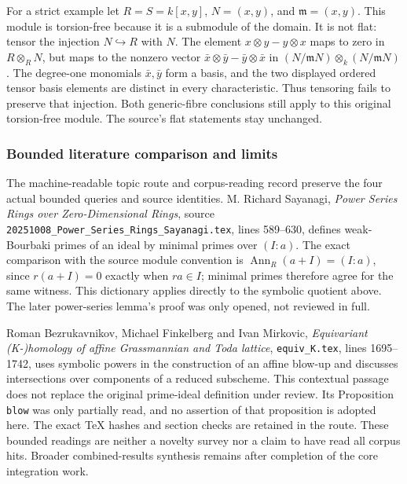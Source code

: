 For a strict example let \(R=S=k[x,y]\), \(N=(x,y)\), and \(\mathfrak m=(x,y)\). This module is torsion-free because it is a submodule of the domain. It is not flat: tensor the injection \(N\hookrightarrow R\) with \(N\). The element \(x\otimes y-y\otimes x\) maps to zero in \(R\otimes_RN\), but maps to the nonzero vector \(\bar x\otimes\bar y-\bar y\otimes\bar x\) in \((N/\mathfrak mN)\otimes_k(N/\mathfrak mN)\). The degree-one monomials \(\bar x,\bar y\) form a basis, and the two displayed ordered tensor basis elements are distinct in every characteristic. Thus tensoring fails to preserve that injection. Both generic-fibre conclusions still apply to this original torsion-free module. The source's flat statements stay unchanged.

\subsubsection{Bounded literature comparison and limits}\label{bounded-literature-comparison-and-limits}

The machine-readable topic route and corpus-reading record preserve the four actual bounded queries and source identities. M. Richard Sayanagi, \emph{Power Series Rings over Zero-Dimensional Rings}, source \texttt{20251008\_Power\_Series\_Rings\_Sayanagi.tex}, lines 589--630, defines weak-Bourbaki primes of an ideal by minimal primes over \((I:a)\). The exact comparison with the source module convention is \(\operatorname{Ann}_R(a+I)=(I:a)\), since \(r(a+I)=0\) exactly when \(ra\in I\); minimal primes therefore agree for the same witness. This dictionary applies directly to the symbolic quotient above. The later power-series lemma's proof was only opened, not reviewed in full.

Roman Bezrukavnikov, Michael Finkelberg and Ivan Mirkovic, \emph{Equivariant (K-)homology of affine Grassmannian and Toda lattice}, \texttt{equiv\_K.tex}, lines 1695--1742, uses symbolic powers in the construction of an affine blow-up and discusses intersections over components of a reduced subscheme. This contextual passage does not replace the original prime-ideal definition under review. Its Proposition \texttt{blow} was only partially read, and no assertion of that proposition is adopted here. The exact TeX hashes and section checks are retained in the route. These bounded readings are neither a novelty survey nor a claim to have read all corpus hits. Broader combined-results synthesis remains after completion of the core integration work.
